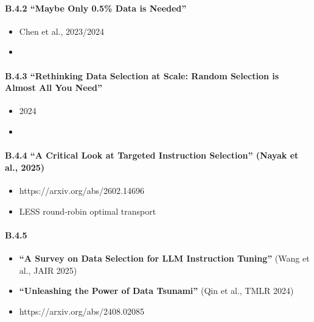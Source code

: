 \documentclass[
  12pt,
]{article}
\providecommand{\tightlist}{%
  \setlength{\itemsep}{0pt}\setlength{\parskip}{0pt}}
\begin{document}
\paragraph{B.4.2 ``Maybe Only 0.5\% Data is
Needed''}\label{b.4.2-maybe-only-0.5-data-is-needed}

\begin{itemize}
\tightlist
\item
  \textbf{}Chen et al., 2023/2024
\item
  \textbf{}
\end{itemize}

\paragraph{B.4.3 ``Rethinking Data Selection at Scale: Random Selection
is Almost All You
Need''}\label{b.4.3-rethinking-data-selection-at-scale-random-selection-is-almost-all-you-need}

\begin{itemize}
\tightlist
\item
  \textbf{}2024
\item
  \textbf{}
\end{itemize}

\paragraph{B.4.4 ``A Critical Look at Targeted Instruction Selection''
(Nayak et al.,
2025)}\label{b.4.4-a-critical-look-at-targeted-instruction-selection-nayak-et-al.-2025}

\begin{itemize}
\tightlist
\item
  \textbf{}https://arxiv.org/abs/2602.14696
\item
  \textbf{}LESS  round-robin
  optimal transport 
\end{itemize}

\paragraph{B.4.5 }\label{b.4.5-ux7efcux8ff0ux8bbaux6587}

\begin{itemize}
\tightlist
\item
  \textbf{``A Survey on Data Selection for LLM Instruction Tuning''}
  (Wang et al., JAIR 2025)
\item
  \textbf{``Unleashing the Power of Data Tsunami''} (Qin et al., TMLR
  2024)
\item
  \textbf{}https://arxiv.org/abs/2408.02085
\end{itemize}
\end{document}
